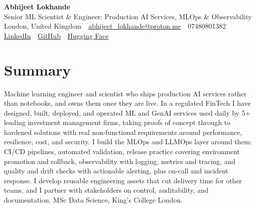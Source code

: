 \documentclass[10pt,a4paper]{article}
\newcommand{\sep}{\,\textcolor{accent!60}{\textbar}\,}
\begin{document}
\begin{center}
  {\fontsize{24}{26}\selectfont\bfseries Abhijeet Lokhande}\\[3pt]
  {\color{accent}\large Senior ML Scientist \& Engineer: Production AI Services, MLOps \& Observability}\\[5pt]
  {\small
    London, United Kingdom \sep
    \href{mailto:abhijeet_lokhande@proton.me}{abhijeet\_lokhande@proton.me} \sep
    07480801382 \\[2pt]
    \href{https://www.linkedin.com/in/ablds/}{LinkedIn} \sep
    \href{https://github.com/abhijeetscode}{GitHub} \sep
    \href{https://huggingface.co/ab-ai}{Hugging Face}
  }
\end{center}
\vspace{2pt}

\section{Summary}
Machine learning engineer and scientist who ships production AI services rather than notebooks, and owns them once they are live. In a regulated FinTech I have designed, built, deployed, and operated ML and GenAI services used daily by 5+ leading investment management firms, taking proofs of concept through to hardened solutions with real non-functional requirements around performance, resilience, cost, and security. I build the MLOps and LLMOps layer around them: CI/CD pipelines, automated validation, release practice covering environment promotion and rollback, observability with logging, metrics and tracing, and quality and drift checks with actionable alerting, plus on-call and incident response. I develop reusable engineering assets that cut delivery time for other teams, and I partner with stakeholders on control, auditability, and documentation. MSc Data Science, King's College London.

\end{document}
